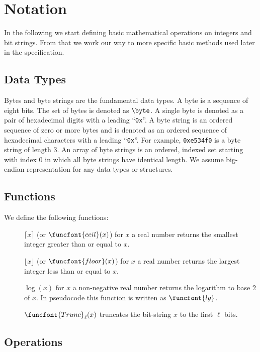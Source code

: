  
\section{Notation}
\label{sec:notation}


In the following we start defining basic mathematical operations on integers and bit strings. From that we work our way to more specific basic methods used later in the specification.

\subsection{Data Types}

Bytes and byte strings are the fundamental data types. A byte is a sequence of eight bits. The set of bytes is denoted as $\byte$. A single byte is denoted as a pair of hexadecimal digits with a leading ``\texttt{0x}''. A byte string is an ordered sequence of zero or more bytes and is denoted as an ordered sequence of hexadecimal characters with a leading ``\texttt{0x}''. For example, \texttt{0xe534f0} is a byte string of length 3. An array of byte strings is an ordered, indexed set starting with index 0 in which all byte strings have identical length. We assume big-endian representation for any data types or structures.

\subsection{Functions}

We define the following functions:
\begin{description}
    \item[]$\lceil x \rceil$ (or $\funcfont{ceil}(x)$) for $x$ a real number returns the smallest integer greater than or equal to $x$.
    \item[]$\lfloor x \rfloor$ (or $\funcfont{floor}(x)$) for $x$ a real number returns the largest integer less than or equal to $x$.
    \item[]$\log(x)$ for $x$ a non-negative real number returns the logarithm to base 2 of $x$. In pseudocode this function is written as $\funcfont{lg}$.
    \item[]$\funcfont{Trunc}_\ell(x)$ truncates the bit-string $x$ to the first $\ell$ bits.
\end{description}

\subsection{Operations}

